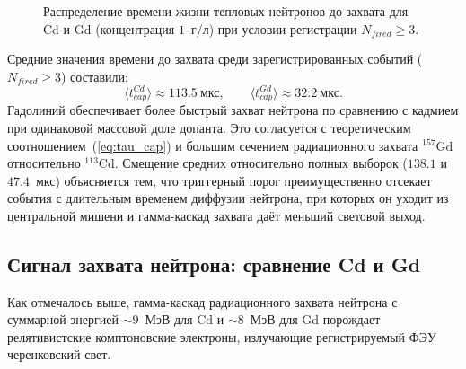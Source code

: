 \documentclass[a4paper,12pt]{extarticle}
\begin{document}
\begin{figure}[h!]
\centering
{}
\caption{Распределение времени жизни тепловых нейтронов до захвата для Cd и Gd (концентрация $1$~г/л) при условии регистрации $N_{fired}\ge 3$.}
\label{fig:lifetime}
\end{figure}

Средние значения времени до захвата среди зарегистрированных событий ($N_{fired}\ge 3$) составили:
\begin{equation}
    \langle t_{cap}^{Cd}\rangle \approx 113.5~\text{мкс},\qquad \langle t_{cap}^{Gd}\rangle \approx 32.2~\text{мкс}.
\end{equation}
Гадолиний обеспечивает более быстрый захват нейтрона по сравнению с кадмием при одинаковой массовой доле допанта. Это согласуется с теоретическим соотношением~(\ref{eq:tau_cap}) и большим сечением радиационного захвата $^{157}\text{Gd}$ относительно $^{113}\text{Cd}$. Смещение средних относительно полных выборок ($138.1$ и $47.4$~мкс) объясняется тем, что триггерный порог преимущественно отсекает события с длительным временем диффузии нейтрона, при которых он уходит из центральной мишени и гамма-каскад захвата даёт меньший световой выход.

\subsection{Сигнал захвата нейтрона: сравнение Cd и Gd}
Как отмечалось выше, гамма-каскад радиационного захвата нейтрона с суммарной энергией $\sim 9$~МэВ для Cd и $\sim 8$~МэВ для Gd порождает релятивистские комптоновские электроны, излучающие регистрируемый ФЭУ черенковский свет.
\end{document}
